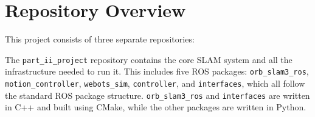 \newpage
\section{Repository Overview}
\label{sec:repository-overview}
This project consists of three separate repositories:

\newcommand{\locindent}{3.3em}
\newcommand{\locsmallindent}{2em}
\newcommand{\locdiff}[3]{
    \makebox[#3][r]{\textcolor{PineGreen}{\texttt{+#1}}}
    \makebox[#3][r]{\textcolor{BrickRed}{\texttt{-#2}}}
}
\newcommand{\locadd}[2]{
    \makebox[#2][r]{\textcolor{PineGreen}{\texttt{+#1}}}
    \makebox[#2][r]{}
}
\newcommand{\locaddnospace}[2]{
    \makebox[#2][r]{\textcolor{PineGreen}{\texttt{+#1}}}
}
\newcommand{\locdoublespace}[1]{
    \makebox[#1][r]{}
    \makebox[#1][r]{}
}
\newcommand{\locsinglespace}[1]{
    \makebox[#1][r]{}
}

The \texttt{part\_ii\_project} repository contains the core SLAM system and all the infrastructure needed to run it. This includes five ROS packages: \texttt{orb\_slam3\_ros}, \texttt{motion\_controller}, \texttt{webots\_sim}, \texttt{controller}, and \texttt{interfaces}, which all follow the standard ROS package structure. \texttt{orb\_slam3\_ros} and \texttt{interfaces} are written in C++ and built using CMake, while the other packages are written in Python.

